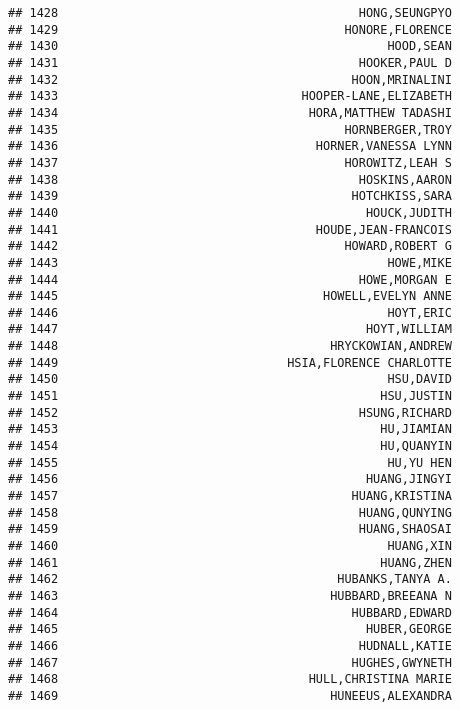 \documentclass[
]{article}
\begin{document}
\begin{verbatim}
## 1428                                          HONG,SEUNGPYO
## 1429                                        HONORE,FLORENCE
## 1430                                              HOOD,SEAN
## 1431                                          HOOKER,PAUL D
## 1432                                         HOON,MRINALINI
## 1433                                  HOOPER-LANE,ELIZABETH
## 1434                                   HORA,MATTHEW TADASHI
## 1435                                        HORNBERGER,TROY
## 1436                                    HORNER,VANESSA LYNN
## 1437                                        HOROWITZ,LEAH S
## 1438                                          HOSKINS,AARON
## 1439                                         HOTCHKISS,SARA
## 1440                                           HOUCK,JUDITH
## 1441                                    HOUDE,JEAN-FRANCOIS
## 1442                                        HOWARD,ROBERT G
## 1443                                              HOWE,MIKE
## 1444                                          HOWE,MORGAN E
## 1445                                     HOWELL,EVELYN ANNE
## 1446                                              HOYT,ERIC
## 1447                                           HOYT,WILLIAM
## 1448                                      HRYCKOWIAN,ANDREW
## 1449                                HSIA,FLORENCE CHARLOTTE
## 1450                                              HSU,DAVID
## 1451                                             HSU,JUSTIN
## 1452                                          HSUNG,RICHARD
## 1453                                             HU,JIAMIAN
## 1454                                             HU,QUANYIN
## 1455                                              HU,YU HEN
## 1456                                           HUANG,JINGYI
## 1457                                         HUANG,KRISTINA
## 1458                                          HUANG,QUNYING
## 1459                                          HUANG,SHAOSAI
## 1460                                              HUANG,XIN
## 1461                                             HUANG,ZHEN
## 1462                                       HUBANKS,TANYA A.
## 1463                                      HUBBARD,BREEANA N
## 1464                                         HUBBARD,EDWARD
## 1465                                           HUBER,GEORGE
## 1466                                          HUDNALL,KATIE
## 1467                                         HUGHES,GWYNETH
## 1468                                   HULL,CHRISTINA MARIE
## 1469                                      HUNEEUS,ALEXANDRA

\end{verbatim}
\end{document}
